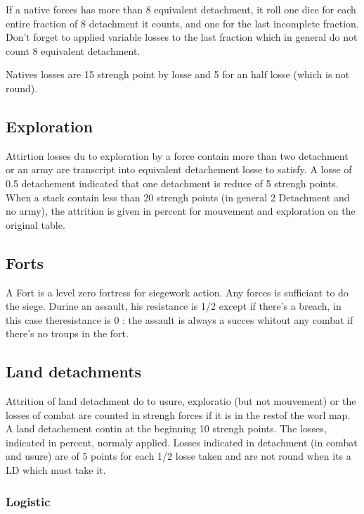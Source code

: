 If a native forces has more than 8 equivalent detachment, it roll one dice
for each entire fraction of 8 detachment it counts, and one for the last
incomplete fraction. Don't forget to applied variable losses to the last
fraction which in general do not count 8 equivalent detachment.

Natives losses are 15 strengh point by losse and 5 for an half losse
(which is not round).

\subsection{Exploration}
Attirtion losses du to exploration by a force contain more than two
detachment or an army are transcript into equivalent detachement losse to   
satisfy. A losse of 0.5 detachement indicated that one detachment is
reduce of 5 strengh points. When a stack contain less than 20 strengh
points (in general 2 Detachment and no army), the attrition is given in
percent for mouvement and exploration on the original table.

\hspace*{-10mm}
\exploration

\subsection{Forts}

A Fort is a level zero fortress for siegework action. Any forces is
sufficiant to do the siege. Durine an assault, his resistance is 1/2   
except if there's a breach, in this case theresistance is 0 : the assault
is always a succes whitout any combat if there's no troups in the fort.


\subsection{Land detachments}

Attrition of land detachment do to usure, exploratio (but not mouvement)
or the losses of combat are counted in strengh forces if it is in the     
restof the worl map. A land detachement contin at  the beginning 10 
strengh points. The losses, indicated in percent, normaly applied. Losses
indicated in detachment (in combat and usure) are of 5 points for each 1/2
losse taken and are not round when its a LD which must take it.


\subsubsection{Logistic}

